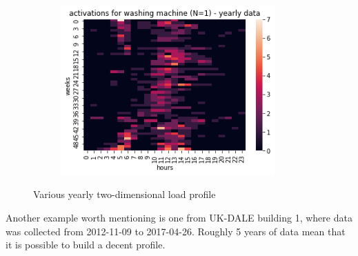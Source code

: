 \begin{figure}[H]
\begin{subfigure}{.32\textwidth}
		\includegraphics[width=0.9\textwidth]{../Figures/LPS/HM_Ywh_wm.png}
		\label{fig:HM_Ywh_wm}
	\end{subfigure}%
	\caption{Various yearly two-dimensional load profile}
\end{figure}

Another example worth mentioning is one from UK-DALE building 1, where data was collected from 2012-11-09 to 2017-04-26.
Roughly 5 years of data mean that it is possible to build a decent profile. 

